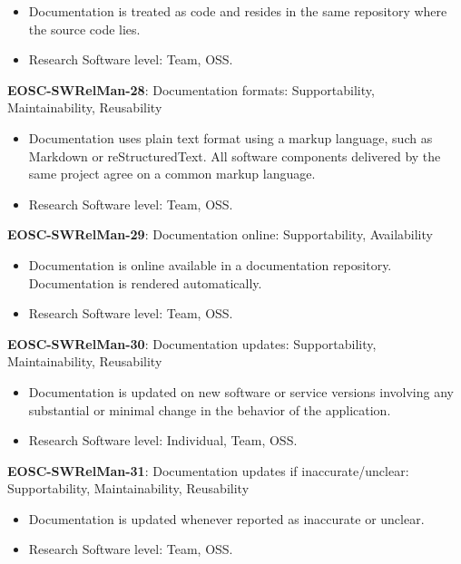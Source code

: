 \begin{itemize}
    \item Documentation is treated as code and resides in the same repository where the source code lies. \cite{orviz_set_2017}
    \item Research Software level: Team, OSS.
\end{itemize}

\textbf{EOSC-SWRelMan-28}: Documentation formats: Supportability, Maintainability, Reusability

\begin{itemize}
    \item Documentation uses plain text format using a markup language, such as Markdown or reStructuredText. All software components delivered by the same project agree on a common markup language. \cite{orviz_set_2017,raymond_software_2013}
    \item Research Software level: Team, OSS.
\end{itemize}

\textbf{EOSC-SWRelMan-29}: Documentation online: Supportability, Availability

\begin{itemize}
    \item Documentation is online available in a documentation repository. Documentation is rendered automatically. \cite{orviz_set_2017,orviz_fernandez_eosc-synergy_2020}
    \item Research Software level: Team, OSS.
\end{itemize}

\textbf{EOSC-SWRelMan-30}: Documentation updates: Supportability, Maintainability, Reusability

\begin{itemize}
    \item Documentation is updated on new software or service versions involving any substantial or minimal change in the behavior of the application. \cite{orviz_set_2017,orviz_fernandez_eosc-synergy_2020,raymond_software_2013}
    \item Research Software level: Individual, Team, OSS.
\end{itemize}

\textbf{EOSC-SWRelMan-31}: Documentation updates if inaccurate/unclear: Supportability, Maintainability, Reusability

\begin{itemize}
    \item Documentation is updated whenever reported as inaccurate or unclear. \cite{orviz_set_2017,orviz_fernandez_eosc-synergy_2020}
    \item Research Software level: Team, OSS.
\end{itemize}

